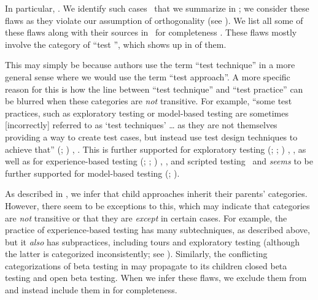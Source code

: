 \ifnotpaper\else\fi

\label{multiCats}
In particular, \multiCatIntro{}. We identify \multiCatCount{} such cases%
\ifnotpaper\ that we summarize in \fi; we consider these
flaws as they violate our assumption of orthogonality (see
). We list \ifnotpaper all \else some \fi of these flaws
along with their sources in \ifnotpaper\ for completeness%
\fi. These flaws mostly involve the category of ``test
\multiCatMax{}'', which shows up in \multiCatMaxCount{} of them. \ifnotpaper
    \begin{table}
        \vspace{-1cm}
        
        \vspace{-1cm}
    \end{table}
\fi This may simply be because authors use the term ``test technique'' in a
more general sense where we would use the term ``test approach''. A more
specific reason for this is how the line between ``test technique'' and
``test practice'' can be blurred when these categories are \emph{not}
transitive. For example, ``some test practices, such as exploratory testing or
model-based testing are sometimes [incorrectly] referred to as `test techniques'
\dots{} as they are not themselves providing a way to create test cases, but
instead use test design techniques to achieve that'' \ifnotpaper
    (\citealp[p.~11]{IEEE2022}; \citeyear[p.~5]{IEEE2021a})\else
    \cite[p.~11]{IEEE2022}, \cite[p.~5]{IEEE2021a}\fi. This is further
supported for exploratory testing \ifnotpaper (\citeyear[p.~33]{IEEE2022};
    \citeyear[p.~viii]{IEEE2021b}; \citeyear[p.~13]{IEEE2013}) \else
    \cite[p.~33]{IEEE2022}, \cite[p.~viii]{IEEE2021b}, \cite[p.~13]{IEEE2013}
\fi as well as for experience-based testing \ifnotpaper
    (\citeyear[p.~4]{IEEE2022}; \citeyear[pp.~viii, 4]{IEEE2021b};
    \citeyear[p.~33]{IEEE2013}) \else \cite[p.~4]{IEEE2022},
    \cite[pp.~viii, 4]{IEEE2021b}, \cite[p.~33]{IEEE2013} \fi and scripted
testing \citeyearpar[p.~33]{IEEE2022}\ifnotpaper\ and \emph{seems} to be
    further supported for model-based testing
    (\citealp[pp.~1\==2]{EngströmAndPetersen2015}; \citealp[p.~4]{Kam2008})\fi.

\ifnotpaper
    As described in , we infer that child approaches inherit their
    parents' categories. However, there seem to be exceptions to this, which
    may indicate that categories are \emph{not} transitive or that they are
    \emph{except} in certain cases. For example, the practice of experience-based
    testing has many subtechniques, as described above, but it \emph{also} has
    subpractices, including tours \citep[p.~34]{IEEE2022} and exploratory testing
    (although the latter is categorized inconsistently; see ).
    Similarly, the conflicting categorizations of beta testing in
     may propagate to its children closed beta testing and
    open beta testing. When we infer these flaws, we exclude them from
     and instead include them in
     for completeness.
\fi

